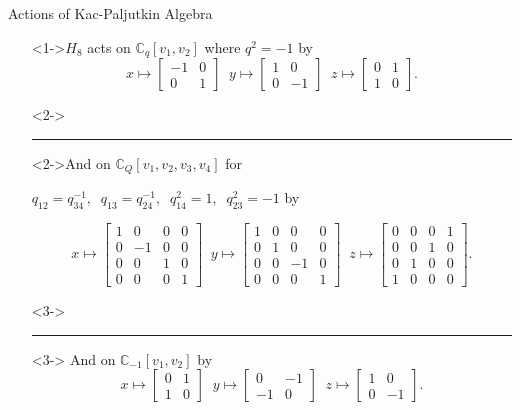 \documentclass{beamer}
\begin{document}
\begin{frame}{Actions of Kac-Paljutkin Algebra}

\begin{itemize}
    \item[]<1->$H_8$ acts on $\mathbb{C}_q[v_1,v_2]$ where $q^2=-1$ by 
    \[
    x\mapsto \begin{bmatrix}-1 & 0\\0 & 1\end{bmatrix} \;\; y\mapsto \begin{bmatrix} 1 & 0\\ 0 & -1\end{bmatrix} \;\; z\mapsto\begin{bmatrix} 0 & 1\\ 1 & 0\end{bmatrix}.
    \]
    \item[]<2-> \hrule
    \item[]<2->And on $\mathbb{C}_Q[v_1,v_2,v_3,v_4]$ for 
   
    \vspace{1ex}
    $q_{12}=q_{34}^{-1},\;\;q_{13}=q_{24}^{-1},\;\;q_{14}^2=1,\;\;q_{23}^2=-1$ by


    
    \[
    x\mapsto \begin{bmatrix} 1&0&0&0\\0&-1&0&0\\0&0&1&0\\0&0&0&1\end{bmatrix} \;\; y\mapsto \begin{bmatrix} 1&0&0&0\\0&1&0&0\\0&0&-1&0\\0&0&0&1\end{bmatrix}\;\; z\mapsto\begin{bmatrix}0&0&0&1\\0&0&1&0\\0&1&0&0\\1&0&0&0\end{bmatrix}.
    \]
    
    \item[]<3->\hrule
    \item[]<3-> And on $\mathbb{C}_{-1}[v_1,v_2]$ by 
    \[
    x\mapsto \begin{bmatrix}0&1\\1&0\end{bmatrix}\;\; y\mapsto\begin{bmatrix}0&-1\\-1&0\end{bmatrix}\;\; z\mapsto\begin{bmatrix}1&0\\0&-1\end{bmatrix}.
    \]
\end{itemize}
\end{frame}
\end{document}
